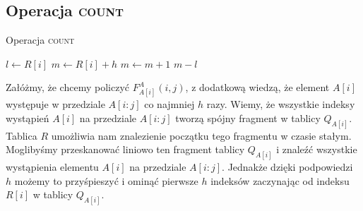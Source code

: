 \subsection{Operacja \textsc{count}}
\begin{algorithm}
    \caption{Operacja \textsc{count}}
    \label{alg:cdlmw-count}
    \begin{algorithmic}[1]
            \State $l \gets R[i]$
            \State $m \gets R[i]+h$
                \State $m \gets m + 1$
            \EndWhile
            \State \Return $m - l$
        \EndFunction
    \end{algorithmic}
\end{algorithm}
Załóżmy, że chcemy policzyć $F^A_{A[i]}(i,j)$, z dodatkową wiedzą, że element $A[i]$ występuje w przedziale $A[i:j]$ co najmniej $h$ razy. Wiemy, że wszystkie indeksy wystąpień $A[i]$ na przedziale $A[i:j]$ tworzą spójny fragment w tablicy $Q_{A[i]}$. Tablica $R$ umożliwia nam znalezienie początku tego fragmentu w czasie stałym. Moglibyśmy przeskanować liniowo ten fragment tablicy  $Q_{A[i]}$ i znaleźć wszystkie wystąpienia elementu $A[i]$ na przedziale $A[i:j]$. Jednakże dzięki podpowiedzi $h$ możemy to przyśpieszyć i ominąć pierwsze $h$ indeksów zaczynając od indeksu $R[i]$ w tablicy $Q_{A[i]}$. 

